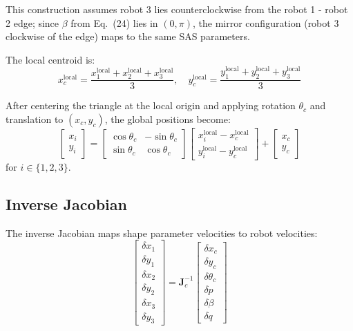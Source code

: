 \documentclass[lettersize,journal]{IEEEtran}
\begin{document}
This construction assumes robot 3 lies counterclockwise from the robot 1 - robot 2 edge; since $\beta$ from Eq.~(24) lies in $(0, \pi)$, the mirror configuration (robot 3 clockwise of the edge) maps to the same SAS parameters.

The local centroid is:
\begin{equation}
x_c^{\text{local}} = \frac{x_1^{\text{local}} + x_2^{\text{local}} + x_3^{\text{local}}}{3}, \quad y_c^{\text{local}} = \frac{y_1^{\text{local}} + y_2^{\text{local}} + y_3^{\text{local}}}{3}
\end{equation}

After centering the triangle at the local origin and applying rotation $\theta_c$ and translation to $(x_c, y_c)$, the global positions become:
\begin{equation}
\begin{bmatrix} x_i \\ y_i \end{bmatrix} = \begin{bmatrix} \cos\theta_c & -\sin\theta_c \\ \sin\theta_c & \cos\theta_c \end{bmatrix} \begin{bmatrix} x_i^{\text{local}} - x_c^{\text{local}} \\ y_i^{\text{local}} - y_c^{\text{local}} \end{bmatrix} + \begin{bmatrix} x_c \\ y_c \end{bmatrix}
\end{equation}
for $i \in \{1, 2, 3\}$.

\subsection{Inverse Jacobian}

The inverse Jacobian maps shape parameter velocities to robot velocities:
\begin{equation}
\begin{bmatrix}
\delta x_1 \\ \delta y_1 \\ \delta x_2 \\ \delta y_2 \\ \delta x_3 \\ \delta y_3
\end{bmatrix} =
\mathbf{J}_c^{-1}
\begin{bmatrix}
\delta x_c \\ \delta y_c \\ \delta \theta_c \\ \delta p \\ \delta \beta \\ \delta q
\end{bmatrix}
\end{equation}
\end{document}
